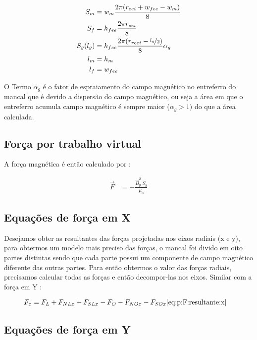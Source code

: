 \begin{align}
	S_m &= w_m     	\frac{2 \pi (r_{eei} + w_{fee} - w_m)}{8} \\
	S_f &= h_{fee} 	\frac{2 \pi r_{eei}}{8} \\
	S_g(l_g) &= h_{fee}	\frac{2 \pi (r_{reei} - \nicefrac{l_g}{2})}{8} \alpha_g \\
	l_m &= h_m \\
	l_f &= w_{fee}
\end{align}


O Termo $ \alpha_g $ é o fator de espraiamento do campo magnético no entreferro do mancal  que é devido a dispersão do campo magnético, ou seja a área em que o entreferro acumula campo magnético é sempre maior ($\alpha_g > 1)$ do que a área calculada.  

\subsection{Força por trabalho virtual}


A força magnética é então calculado por :

\begin{align}
	\vec{F} &= -\frac{ \vec{B}_{g}^2 \; S_g}{\mu_0} \label{eq:passivo:Fx}
\end{align}

\subsection{Equações de força em X}


Desejamos obter as resultantes das forças projetadas nos eixos radiais (x e y), para obtermos um modelo mais preciso das forças, o mancal foi divido em oito partes distintas sendo que cada parte possui um componente de campo magnético diferente das outras partes. Para então obtermos o valor das forças radiais, precisamos calcular todas as forças e então decompor-las nos eixos. Similar com a força em Y :

\begin{align}
	F_x &= F_{L} + F_{NLx} + F_{SLx} - F_{O} - F_{NOx} - F_{SOx} \ref{eq:p:F:resultante:x}
\end{align}

\subsection{Equações de força em Y}

